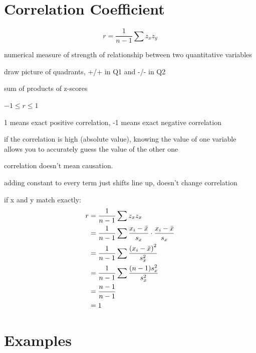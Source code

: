 \documentclass[landscape]{exam}
\begin{document}
  \section{Correlation Coefficient}
  \[
    r = \frac{1}{n - 1} \sum z_x z_y
  \]

  \begin{itemize*}
    \item numerical measure of strength of relationship between two quantitative
      variables

    \item draw picture of quadrants, +/+ in Q1 and -/- in Q2

    \item sum of products of z-scores

    \item $-1 \leq r \leq 1$

    \item 1 means exact positive correlation, -1 means exact negative
      correlation

    \item if the correlation is high (absolute value), knowing the value of
      one variable allows you to accurately guess the value of the
      other one

    \item correlation doesn't mean causation.  

    \item adding constant to every term just shifts line up, doesn't change
      correlation

  \end{itemize*}

  if x and y match exactly:
  \begin{align*}
    r & = \frac{1}{n - 1} \sum z_x z_x \\
      & = \frac{1}{n - 1} \sum \frac{x_i - \bar{x}}{s_x} \cdot \frac{x_i - \bar{x}}{s_x} \\
      & = \frac{1}{n - 1} \sum \frac{\del{ x_i - \bar{x} }^2}{s_x^2} \\
      & = \frac{1}{n - 1} \sum \frac{(n - 1) s_x^2}{s_x^2} \\
      & = \frac{n - 1}{n - 1} \\
      & = 1 \\
  \end{align*}

  \section{Examples}
\end{document}
